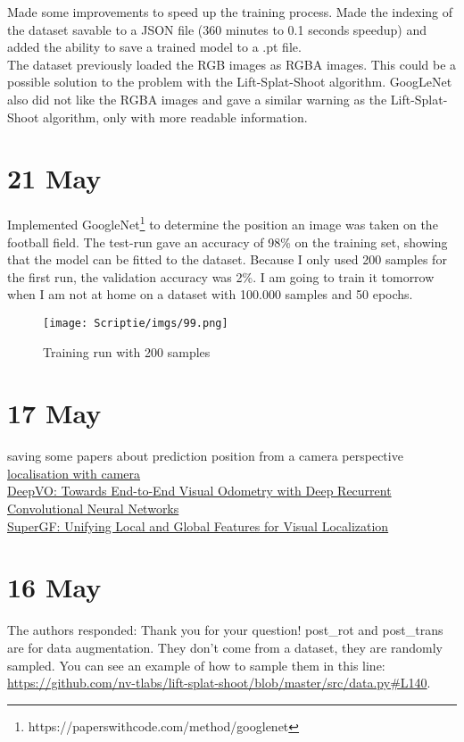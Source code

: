 \documentclass[twoside]{report}
\begin{document}
Made some improvements to speed up the training process. Made the indexing of the dataset savable to a JSON file (360 minutes to 0.1 seconds speedup) and added the ability to save a trained model to a .pt file.
\hfill \break \\
The dataset previously loaded the RGB images as RGBA images. This could be a possible solution to the problem with the Lift-Splat-Shoot algorithm. GoogLeNet also did not like the RGBA images and gave a similar warning as the Lift-Splat-Shoot algorithm, only with more readable information.

\section*{21 May}
Implemented GoogleNet\footnote{https://paperswithcode.com/method/googlenet} to determine the position an image was taken on the football field. The test-run gave an accuracy of 98\% on the training set, showing that the model can be fitted to the dataset. Because I only used 200 samples for the first run, the validation accuracy was 2\%. I am going to train it tomorrow when I am not at home on a dataset with 100.000 samples and 50 epochs.
\begin{figure}[!h]
\begin{centering}
\texttt{[image: Scriptie/imgs/99.png]}
\caption{Training run with 200 samples}
\end{centering}
\end{figure}

\section*{17 May}
saving some papers about prediction position from a camera perspective \newline
\href{https://vciba.springeropen.com/articles/10.1186/s42492-018-0008-z}{localisation with camera} \\
\href{https://arxiv.org/abs/1709.08429}{DeepVO: Towards End-to-End Visual Odometry with Deep Recurrent Convolutional Neural Networks} \\
\href{https://arxiv.org/pdf/2212.13105.pdf}{SuperGF: Unifying Local and Global Features for Visual Localization} \\

\section*{16 May}
The authors responded: Thank you for your question! post\_rot and post\_trans are for data augmentation. They don't come from a dataset, they are randomly sampled. You can see an example of how to sample them in this line: \url{https://github.com/nv-tlabs/lift-splat-shoot/blob/master/src/data.py#L140}.
\end{document}
